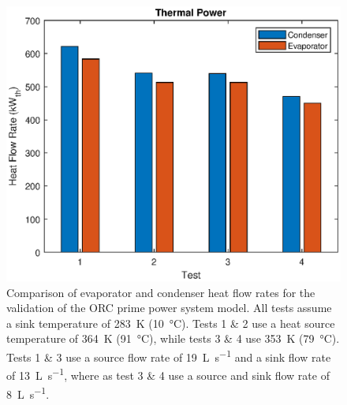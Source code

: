 \begin{figure}[h]
	\centering
	
	\includegraphics[width=\textwidth]{figures/VerificationHeat01}
	
	\caption{Comparison of evaporator and condenser heat flow rates for the validation of the ORC prime power system model. All tests assume a sink temperature of \SI{283}{\kelvin} (\SI{10}{\degreeCelsius}). Tests 1 \& 2 use a heat source temperature of \SI{364}{\kelvin} (\SI{91}{\degreeCelsius}), while tests 3 \& 4 use \SI{353}{\kelvin} (\SI{79}{\degreeCelsius}). Tests 1 \& 3 use a source flow rate of \SI{19}{\liter\per\second} and a sink flow rate of \SI{13}{\liter\per\second}, where as test 3 \& 4 use a source and sink flow rate of \SI{8}{\liter\per\second}.
	}
	\label{fig:verificationHeat01}
\end{figure}